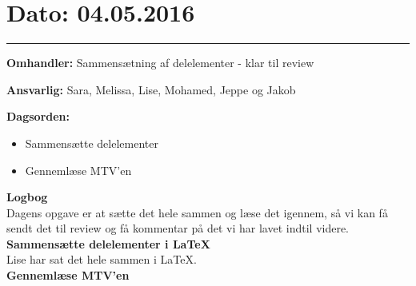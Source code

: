 \section{Dato: 04.05.2016}
\hrule

\textbf{Omhandler:} Sammensætning af delelementer - klar til review

\textbf{Ansvarlig:} Sara, Melissa, Lise, Mohamed, Jeppe og Jakob

\textbf{Dagsorden:}
\begin{itemize}
	\item Sammensætte delelementer
	\item Gennemlæse MTV'en
\end{itemize}

\textbf{Logbog}
\\
Dagens opgave er at sætte det hele sammen og læse det igennem, så vi kan få sendt det til review og få kommentar på det vi har lavet indtil videre.
\\

\textbf{Sammensætte delelementer i LaTeX}
\\
Lise har sat det hele sammen i LaTeX.
\\

\textbf{Gennemlæse MTV'en}
\\
\\

